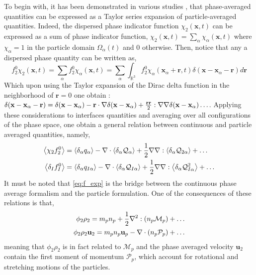 To begin with, it has been demonstrated in various studies \citep{nott2011suspension,jackson1997locally,zhang1994averaged}, that phase-averaged quantities can be expressed as a Taylor series expansion of particle-averaged quantities. 
Indeed, the dispersed phase indicator function $\chi_2(\textbf{x},t)$ can be expressed as a sum of phase indicator function, $\chi_2(\textbf{x},t) = \sum_\alpha\chi_\alpha(\textbf{x},t)$ where $\chi_\alpha =1$ in the particle domain $\Omega_\alpha(t)$ and $0$ otherwise. 
Then, notice that any a dispersed phase quantity can be written as, 
\begin{equation*}
    f^0_2 \chi_2(\textbf{x},t)
    = \sum_\alpha f^0_2 \chi_\alpha(\textbf{x},t) 
    = \sum_\alpha \int_{\mathbb{R}^3} f^0_2 \chi_\alpha(\textbf{x}_\alpha+\textbf{r},t)\delta(\textbf{x}- \textbf{x}_\alpha - \textbf{r}) d\textbf{r} 
\end{equation*}
Which upon using the Taylor expansion of the Dirac delta function in the neighborhood of $\textbf{r}=0$ one obtain :  $\delta(\textbf{x}- \textbf{x}_\alpha - \textbf{r}) = \delta(\textbf{x}- \textbf{x}_\alpha) - \textbf{r}\cdot\mathbf{\nabla} \delta(\textbf{x} - \textbf{x}_\alpha) + \frac{\textbf{rr}}{2}:\mathbf{\nabla}\mathbf{\nabla}\delta(\textbf{x}- \textbf{x}_\alpha)\ldots $.
Applying these considerations to interfaces quantities and averaging over all configurations of the phase space, one obtain a general relation between continuous and particle averaged quantities, namely, 
\begin{align}
    \left<\chi_2f_2^0\right> 
    &=  \left<\delta_\alpha q_\alpha\right>
        - \mathbf{\nabla}\cdot  
        \left<\delta_\alpha \mathcal{Q}_\alpha\right>        
        + \frac{1}{2} \mathbf{\nabla}\mathbf{\nabla} : \left<\delta_\alpha \mathcal{Q}_{2\alpha}\right>
        + \ldots  
        \nonumber\\
    \left<\delta_I f_I^0\right> 
    &=  \left<\delta_\alpha q_{I\alpha}\right>        
        - \mathbf{\nabla}\cdot \left<\delta_\alpha \mathcal{Q}_{I\alpha}\right>
        + \frac{1}{2} \mathbf{\nabla}\mathbf{\nabla} : \left<\delta_\alpha \mathcal{Q}_{I\alpha}^{2}\right>
        + \ldots  
    \label{eq:f_exp}
\end{align}
It must be noted that \ref{eq:f_exp} is the bridge between the continuous phase average formalism and the particle formulation. 
One of the consequences of these relations is that, 
\begin{align}
    \phi_2 \rho_2
    = m_p n_p 
    + \frac{1}{2}\mathbf{\nabla}^2 : (n_p\mathcal{M}_p)+\ldots\\
    \phi_2 \rho_2 \textbf{u}_2
    = m_p n_p \textbf{u}_p 
    - \mathbf{\nabla}\cdot (n_p\mathcal{P}_p)+\ldots
    \label{eq:f_exp_exe}
\end{align}
meaning that $\phi_2\rho_2$ is in fact related to $\mathcal{M}_p$ and the phase averaged velocity $\textbf{u}_2$ contain the first  moment of momentum $\mathcal{P}_p$, which account for rotational and stretching motions of the particles. 

